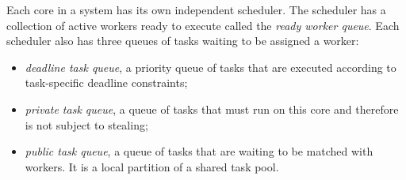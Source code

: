 
Each core in a \Grappa system has its own independent scheduler. The scheduler
has a collection of active workers ready to execute called the {\it
ready worker queue}. Each scheduler also has three queues of tasks
waiting to be assigned a worker:

\begin{itemize}

\item {\it deadline task queue}, a priority queue of tasks that are executed according to task-specific deadline constraints;

\item {\it private task queue}, a queue of tasks that must run on
this core and therefore is not subject to stealing;

\item {\it public task queue}, a queue of tasks that are
  waiting to be matched with workers. It is a local partition of a shared
  task pool.

\end{itemize}


